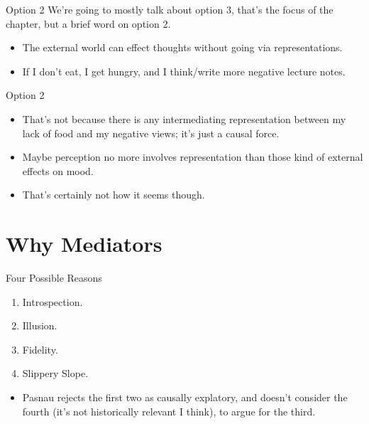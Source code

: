 \documentclass[
  17pt,
  letterpaper,
  ignorenonframetext,
  aspectratio=169,
]{beamer}
\providecommand{\tightlist}{%
  \setlength{\itemsep}{0pt}\setlength{\parskip}{0pt}}\usepackage{longtable,booktabs,array}
\begin{document}
\begin{frame}{Option 2}
\protect\hypertarget{option-2}{}
We're going to mostly talk about option 3, that's the focus of the
chapter, but a brief word on option 2.

\begin{itemize}[<+->]
\tightlist
\item
  The external world can effect thoughts without going via
  representations.
\item
  If I don't eat, I get hungry, and I think/write more negative lecture
  notes.
\end{itemize}
\end{frame}

\begin{frame}{Option 2}
\protect\hypertarget{option-2-1}{}
\begin{itemize}[<+->]
\tightlist
\item
  That's not because there is any intermediating representation between
  my lack of food and my negative views; it's just a causal force.
\item
  Maybe perception no more involves representation than those kind of
  external effects on mood.
\item
  That's certainly not how it seems though.
\end{itemize}
\end{frame}

\hypertarget{why-mediators}{%
\section{Why Mediators}\label{why-mediators}}

\begin{frame}{Four Possible Reasons}
\protect\hypertarget{four-possible-reasons}{}
\begin{enumerate}[<+->]
\tightlist
\item
  Introspection.
\item
  Illusion.
\item
  Fidelity.
\item
  Slippery Slope.
\end{enumerate}

\begin{itemize}[<+->]
\tightlist
\item
  Pasnau rejects the first two as causally explatory, and doesn't
  consider the fourth (it's not historically relevant I think), to argue
  for the third.
\end{itemize}
\end{frame}
\end{document}
